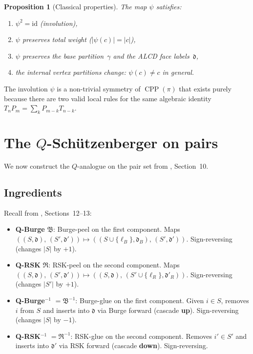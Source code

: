 \documentclass[11pt]{article}
\newcommand{\CPP}{\operatorname{CPP}}
\theoremstyle{plain}
\newtheorem{proposition}[theorem]{Proposition}
\theoremstyle{definition}
\begin{document}
\begin{proposition}[Classical properties]
\label{prop:classical}
The map $\psi$ satisfies:
\begin{enumerate}
  \item $\psi^2 = \mathrm{id}$ \textup{(involution)},
  \item $\psi$ preserves total weight
    \textup{(}$|\psi(c)| = |c|$\textup{)},
  \item $\psi$ preserves the base partition~$\gamma$ and the
    ALCD face labels~$\mathfrak{d}$,
  \item the internal vertex partitions change:
    $\psi(c) \neq c$ in general.
\end{enumerate}
\end{proposition}

The involution $\psi$ is a non-trivial symmetry of
$\CPP(\pi)$ that exists purely because there are two valid
local rules for the same algebraic identity
$T_n P_m = \sum_k P_{m-k} T_{n-k}$.


\section{The $Q$-Sch\"utzenberger on pairs}
\label{sec:Q-schutz}

We now construct the $Q$-analogue on the pair set from
\cite{LOCAL_RULE}, Section~10.

\subsection{Ingredients}

Recall from \cite{LOCAL_RULE}, Sections~12--13:
\begin{itemize}
  \item \textbf{Q-Burge} $\mathfrak{B}$: Burge-peel on the
    first component.  Maps
    $((S, \mathfrak{d}),\, (S', \mathfrak{d}')) \mapsto
    ((S \cup \{\ell_B\}, \mathfrak{d}_B),\,
    (S', \mathfrak{d}'))$.
    Sign-reversing (changes $|S|$ by $+1$).
  \item \textbf{Q-RSK} $\mathfrak{R}$: RSK-peel on the second
    component.  Maps
    $((S, \mathfrak{d}),\, (S', \mathfrak{d}')) \mapsto
    ((S, \mathfrak{d}),\,
    (S' \cup \{\ell_R\}, \mathfrak{d}'_R))$.
    Sign-reversing (changes $|S'|$ by $+1$).
  \item \textbf{Q-Burge$^{-1}$} $= \mathfrak{B}^{-1}$:
    Burge-glue on the first component.  Given $i \in S$,
    removes $i$ from $S$ and inserts into $\mathfrak{d}$ via
    Burge forward (cascade \textbf{up}).
    Sign-reversing (changes $|S|$ by $-1$).
  \item \textbf{Q-RSK$^{-1}$} $= \mathfrak{R}^{-1}$:
    RSK-glue on the second component.  Removes $i' \in S'$
    and inserts into $\mathfrak{d}'$ via RSK forward (cascade
    \textbf{down}).  Sign-reversing.
\end{itemize}
\end{document}
